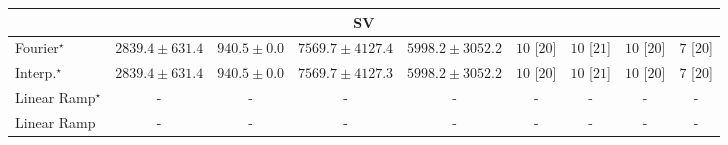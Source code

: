 \begin{tabular}{l|cccc|cccc|}
\cline{1-9}
\multicolumn{9}{c}{\rule{0pt}{8pt}SV} \\
\midrule
Fourier$^\star$ & {\cellcolor[HTML]{C4CBE3}} \color[HTML]{000000} $2839.4\pm 631.4$ & {\cellcolor[HTML]{FFF7FB}} \color[HTML]{000000} $940.5\pm 0.0$ & {\cellcolor[HTML]{023858}} \color[HTML]{F1F1F1} $7569.7\pm 4127.4$ & {\cellcolor[HTML]{056DAC}} \color[HTML]{F1F1F1} $5998.2\pm 3052.2$ & {\cellcolor[HTML]{49006A}} \color[HTML]{F1F1F1} $10$ [$20$] & {\cellcolor[HTML]{49006A}} \color[HTML]{F1F1F1} $10$ [$21$] & {\cellcolor[HTML]{49006A}} \color[HTML]{F1F1F1} $10$ [$20$] & {\cellcolor[HTML]{CD238F}} \color[HTML]{F1F1F1} $7$ [$20$] \\
Interp.$^\star$ & {\cellcolor[HTML]{C4CBE3}} \color[HTML]{000000} $2839.4\pm 631.4$ & {\cellcolor[HTML]{FFF7FB}} \color[HTML]{000000} $940.5\pm 0.0$ & {\cellcolor[HTML]{023858}} \color[HTML]{F1F1F1} $7569.7\pm 4127.3$ & {\cellcolor[HTML]{056DAC}} \color[HTML]{F1F1F1} $5998.2\pm 3052.2$ & {\cellcolor[HTML]{49006A}} \color[HTML]{F1F1F1} $10$ [$20$] & {\cellcolor[HTML]{49006A}} \color[HTML]{F1F1F1} $10$ [$21$] & {\cellcolor[HTML]{49006A}} \color[HTML]{F1F1F1} $10$ [$20$] & {\cellcolor[HTML]{CD238F}} \color[HTML]{F1F1F1} $7$ [$20$] \\
Linear Ramp$^\star$ & {\cellcolor[HTML]{000000}} \color[HTML]{F1F1F1} {\cellcolor{white}} \color{black} - & {\cellcolor[HTML]{000000}} \color[HTML]{F1F1F1} {\cellcolor{white}} \color{black} - & {\cellcolor[HTML]{000000}} \color[HTML]{F1F1F1} {\cellcolor{white}} \color{black} - & {\cellcolor[HTML]{000000}} \color[HTML]{F1F1F1} {\cellcolor{white}} \color{black} - & {\cellcolor[HTML]{000000}} \color[HTML]{F1F1F1} {\cellcolor{white}} \color{black} - & {\cellcolor[HTML]{000000}} \color[HTML]{F1F1F1} {\cellcolor{white}} \color{black} - & {\cellcolor[HTML]{000000}} \color[HTML]{F1F1F1} {\cellcolor{white}} \color{black} - & {\cellcolor[HTML]{000000}} \color[HTML]{F1F1F1} {\cellcolor{white}} \color{black} - \\
Linear Ramp & {\cellcolor[HTML]{000000}} \color[HTML]{F1F1F1} {\cellcolor{white}} \color{black} - & {\cellcolor[HTML]{000000}} \color[HTML]{F1F1F1} {\cellcolor{white}} \color{black} - & {\cellcolor[HTML]{000000}} \color[HTML]{F1F1F1} {\cellcolor{white}} \color{black} - & {\cellcolor[HTML]{000000}} \color[HTML]{F1F1F1} {\cellcolor{white}} \color{black} - & {\cellcolor[HTML]{000000}} \color[HTML]{F1F1F1} {\cellcolor{white}} \color{black} - & {\cellcolor[HTML]{000000}} \color[HTML]{F1F1F1} {\cellcolor{white}} \color{black} - & {\cellcolor[HTML]{000000}} \color[HTML]{F1F1F1} {\cellcolor{white}} \color{black} - & {\cellcolor[HTML]{000000}} \color[HTML]{F1F1F1} {\cellcolor{white}} \color{black} - \\

\end{tabular}
